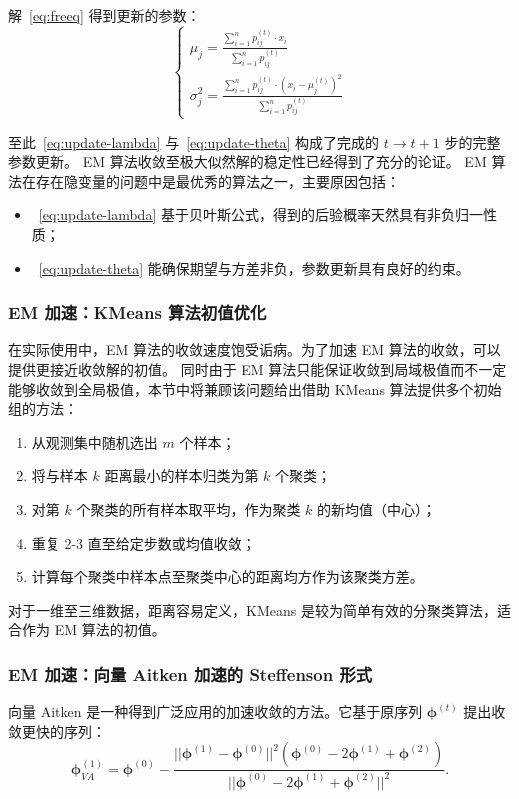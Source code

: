 解~\ref{eq:freeq} 得到更新的参数：
\begin{equation}
    \label{eq:update-theta}
    \begin{cases}
        \mu_j=\frac{\sum_{i=1}^np_{ij}^{(t)}\cdot x_i}{\sum_{i=1}^np_{ij}^{(t)}} \\
        \sigma_j^2=\frac{\sum_{i=1}^np_{ij}^{(t)}\cdot\left(x_i-\mu_j^{(t)}\right)^2}{\sum_{i=1}^np_{ij}^{(t)}}
    \end{cases}
\end{equation}

至此~\eqref{eq:update-lambda} 与~\eqref{eq:update-theta} 构成了完成的 $t\rightarrow t+1$ 步的完整参数更新。
EM 算法收敛至极大似然解的稳定性已经得到了充分的论证。
EM 算法在存在隐变量的问题中是最优秀的算法之一，主要原因包括：
\begin{itemize}
    \item~\eqref{eq:update-lambda} 基于贝叶斯公式，得到的后验概率天然具有非负归一性质；
    \item~\eqref{eq:update-theta} 能确保期望与方差非负，参数更新具有良好的约束。
\end{itemize}

\subsubsection{EM 加速：KMeans 算法初值优化}
在实际使用中，EM 算法的收敛速度饱受诟病。为了加速 EM 算法的收敛，可以提供更接近收敛解的初值。
同时由于 EM 算法只能保证收敛到局域极值而不一定能够收敛到全局极值，本节中将兼顾该问题给出借助 KMeans 算法提供多个初始组的方法：

\begin{enumerate}
    \item 从观测集中随机选出 $m$ 个样本；
    \item 将与样本 $k$ 距离最小的样本归类为第 $k$ 个聚类；
    \item 对第 $k$ 个聚类的所有样本取平均，作为聚类 $k$ 的新均值（中心）；
    \item 重复 2-3 直至给定步数或均值收敛；
    \item 计算每个聚类中样本点至聚类中心的距离均方作为该聚类方差。
\end{enumerate}

对于一维至三维数据，距离容易定义，KMeans 是较为简单有效的分聚类算法，适合作为 EM 算法的初值。

\subsubsection{EM 加速：向量 Aitken 加速的 Steffenson 形式}
向量 Aitken 是一种得到广泛应用的加速收敛的方法。它基于原序列 $\boldsymbol{\phi}^{(t)}$ 提出收敛更快的序列：
\begin{equation}
    \label{eq:vector-aitken}
    \boldsymbol{\phi}_{VA}^{(1)}=\boldsymbol{\phi}^{(0)}-
    \frac{||\boldsymbol{\phi}^{(1)}-\boldsymbol{\phi}^{(0)}||^2
    (\boldsymbol{\phi}^{(0)}-2\boldsymbol{\phi}^{(1)}+\boldsymbol{\phi}^{(2)})}
    {||\boldsymbol{\phi}^{(0)}-2\boldsymbol{\phi}^{(1)}+\boldsymbol{\phi}^{(2)}||^2}.
\end{equation}

